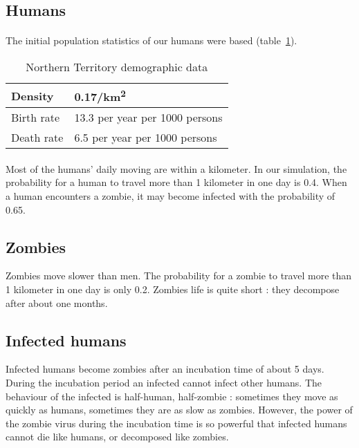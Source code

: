 \documentclass{report}
\begin{document}
\subsection{Humans}
\paragraph{}
The initial population statistics of our humans were based  (table~\ref{AustralianData}).
\begin{table}[!h]
    \begin{tabular}{|l|l|}
      \hline
        Density    & 0.17/km\textsuperscript{2} \\
      \hline
        Birth rate & 13.3 per year per 1000 persons \\
      \hline
        Death rate & 6.5 per year per 1000 persons \\
      \hline
\end{tabular}
\caption{Northern Territory demographic data}\label{AustralianData}
\end{table}

\paragraph{}
Most of the humans' daily moving are within a kilometer. In our simulation, the probability for a human to travel more than 1 kilometer in one day is 0.4. When a human encounters a zombie, it may become infected with the probability of 0.65.

\subsection{Zombies}
Zombies move slower than men. The probability for a zombie to travel more than 1 kilometer in one day is only 0.2. Zombies life is quite short : they decompose after about one months.

\subsection{Infected humans}
Infected humans become zombies after an incubation time of about 5 days. During the incubation period an infected cannot infect other humans. The behaviour of the infected is half-human, half-zombie : sometimes they move as quickly as humans, sometimes they are as slow as zombies. However, the power of the zombie virus during the incubation time is so powerful that infected humans cannot die like humans, or decomposed like zombies.
\end{document}
